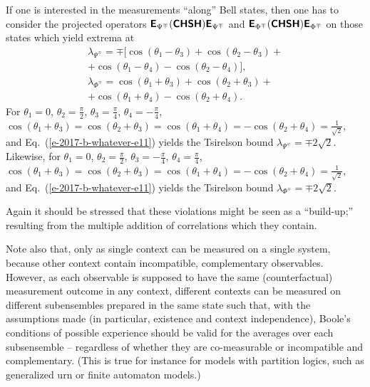 \documentclass[%
  twocolumn,
 showpacs,
 showkeys,
 preprintnumbers,
 amsmath,amssymb,
 aps,
  pra,
  longbibliography,
 floatfix,
 ]{revtex4-1}
\begin{document}
If one is interested in the measurements ``along'' Bell states, then one has to consider
 the projected operators
$\textsf{\textbf{E}}_{\Psi^\mp} (\textsf{\textbf{CHSH}} ) \textsf{\textbf{E}}_{\Psi^\mp} $ and
$\textsf{\textbf{E}}_{\Phi^\mp} (\textsf{\textbf{CHSH}} )\textsf{\textbf{E}}_{\Phi^\mp} $
on those states which yield extrema at
\begin{equation}
\begin{split}
\lambda_{\Psi^\mp}=
\mp \big[\cos (\theta_1 - \theta_3) +   \cos (\theta_2 - \theta_3) + \\ +\cos (\theta_1 - \theta_4) -  \cos (\theta_2 - \theta_4)\big], \\
\lambda_{\Phi^\mp}=
\cos (\theta_1 + \theta_3) +   \cos (\theta_2 + \theta_3) + \\ +\cos (\theta_1 + \theta_4) -  \cos (\theta_2 + \theta_4)
.
\end{split}
\label{e-2017-b-whatever-e11}
\end{equation}
For
$\theta_1=0$,
$\theta_2= \frac{\pi}{2}$,
$\theta_3=\frac{\pi}{4}$,
$\theta_4 = - \frac{\pi}{4}$,
$\cos (\theta_1 + \theta_3) =   \cos (\theta_2 + \theta_3) = \cos (\theta_1 + \theta_4) = -  \cos (\theta_2 + \theta_4)   =\frac{1}{\sqrt{2}}$,
and Eq.~(\ref{e-2017-b-whatever-e11})
yields the Tsirelson bound
$ \lambda_{\Psi^\mp}=  \mp 2 \sqrt{2}$.
Likewise, for
$\theta_1=0$,
$\theta_2= \frac{\pi}{2}$,
$\theta_3=- \frac{\pi}{4}$,
$\theta_4 = \frac{\pi}{4}$,
$\cos (\theta_1 + \theta_3) =   \cos (\theta_2 + \theta_3) = \cos (\theta_1 + \theta_4) = -  \cos (\theta_2 + \theta_4)   =\frac{1}{\sqrt{2}}$,
and Eq.~(\ref{e-2017-b-whatever-e11})
yields the Tsirelson bound
$\lambda_{\Phi^\mp}=    \mp 2 \sqrt{2}$.

Again it should be stressed that these violations might be seen as a ``build-up;''
resulting from the multiple addition of correlations which they contain.

Note also that, only as single context can be measured on a single system,
because other context contain incompatible, complementary observables.
However, as each observable is supposed to have the same (counterfactual) measurement outcome
in any context,
different contexts can be measured on different subensembles
prepared in the same state such that, with the assumptions made (in particular,
existence and context independence), Boole's conditions of possible
experience should be
valid for the averages over each subsensemble
--
regardless of whether they are co-measurable or incompatible and complementary.
(This is true for instance for models with
partition logics, such as generalized urn or finite automaton models.)
\end{document}
